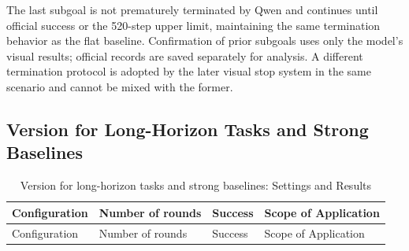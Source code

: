 The last subgoal is not prematurely terminated by Qwen and continues until official success or the 520-step upper limit, maintaining the same termination behavior as the flat baseline. Confirmation of prior subgoals uses only the model's visual results; official records are saved separately for analysis. A different termination protocol is adopted by the later visual stop system in the same scenario and cannot be mixed with the former.

\subsection{Version for Long-Horizon Tasks and Strong Baselines}\label{s09-detail-2}

\FloatBarrier\begingroup\small\setlength{\tabcolsep}{2.5pt}
\begin{longtable}[]{@{}
  >{\raggedright\arraybackslash}p{}
  >{\raggedleft\arraybackslash}p{}
  >{\raggedleft\arraybackslash}p{}
  >{\raggedright\arraybackslash}p{}@{}}
\caption{Version for long-horizon tasks and strong baselines: Settings and Results}\label{tab:s09-1}\tabularnewline
\toprule\noalign{}
\begin{minipage}[b]{\linewidth}\raggedright
Configuration
\end{minipage} & \begin{minipage}[b]{\linewidth}\raggedleft
Number of rounds
\end{minipage} & \begin{minipage}[b]{\linewidth}\raggedleft
Success
\end{minipage} & \begin{minipage}[b]{\linewidth}\raggedright
Scope of Application
\end{minipage} \\
\midrule\noalign{}
\endfirsthead
\toprule\noalign{}
\begin{minipage}[b]{\linewidth}\raggedright
Configuration
\end{minipage} & \begin{minipage}[b]{\linewidth}\raggedleft
Number of rounds
\end{minipage} & \begin{minipage}[b]{\linewidth}\raggedleft
Success
\end{minipage} & \begin{minipage}[b]{\linewidth}\raggedright
Scope of Application

\end{minipage}
\end{longtable}
